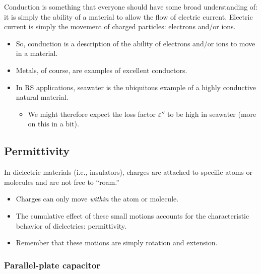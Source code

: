 \documentclass[11pt, oneside]{article}
\begin{document}
Conduction is something that everyone should have some broad understanding of: it is simply the ability of a material to allow the flow of electric current. Electric current is simply the movement of charged particles: electrons and/or ions.
\begin{itemize}
	\item So, conduction is a description of the ability of electrons and/or ions to move in a material.
	\item Metals, of course, are examples of excellent conductors.
	\item In RS applications, seawater is the ubiquitous example of a highly conductive natural material.
	\begin{itemize}
		\item We might therefore expect the loss factor $\varepsilon''$ to be high in seawater (more on this in a bit).
	\end{itemize}
\end{itemize}

\subsection{Permittivity}

In dielectric materials (i.e., insulators), charges are attached to specific atoms or molecules and are not free to ``roam.''
\begin{itemize}
	\item Charges can only move \emph{within} the atom or molecule.
	\item The cumulative effect of these small motions accounts for the characteristic behavior of dielectrics: permittivity.
	\item Remember that these motions are simply rotation and extension.
\end{itemize}

\subsubsection{Parallel-plate capacitor}
\end{document}

